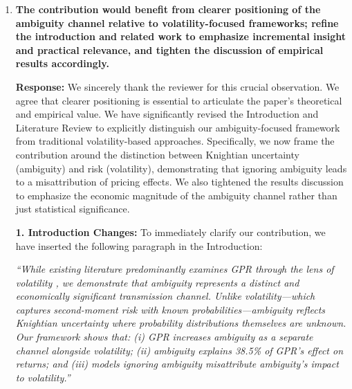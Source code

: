 \documentclass[12pt]{article}
\begin{document}
\begin{enumerate}
\begin{responsebox}
    \vspace{0.5cm}

    \textbf{4. Alternative Explanations:}
    We have tested and ruled out size effects by adding:

    \textit{``Results hold after controlling for firm size and interaction terms. The SOE buffer persists within size quintiles, suggesting it's not merely a scale effect.''}
    \end{responsebox}

    \vspace{0.5cm}

    \item \textbf{The contribution would benefit from clearer positioning of the ambiguity channel relative to volatility-focused frameworks; refine the introduction and related work to emphasize incremental insight and practical relevance, and tighten the discussion of empirical results accordingly.}

    \begin{responsebox}
    \vspace{0.5cm}
    \textbf{Response:} We sincerely thank the reviewer for this crucial observation. We agree that clearer positioning is essential to articulate the paper's theoretical and empirical value. We have significantly revised the Introduction and Literature Review to explicitly distinguish our ambiguity-focused framework from traditional volatility-based approaches. Specifically, we now frame the contribution around the distinction between Knightian uncertainty (ambiguity) and risk (volatility), demonstrating that ignoring ambiguity leads to a misattribution of pricing effects. We also tightened the results discussion to emphasize the economic magnitude of the ambiguity channel rather than just statistical significance.

    \textbf{1. Introduction Changes:}
    To immediately clarify our contribution, we have inserted the following paragraph in the Introduction:

    \begin{highlightbox}
    \textit{``While existing literature predominantly examines GPR through the lens of volatility \citep{Bouri2021, Apergis2021}, we demonstrate that ambiguity represents a distinct and economically significant transmission channel. Unlike volatility---which captures second-moment risk with known probabilities---ambiguity reflects Knightian uncertainty where probability distributions themselves are unknown. Our framework shows that: (i) GPR increases ambiguity as a separate channel alongside volatility; (ii) ambiguity explains 38.5\% of GPR's effect on returns; and (iii) models ignoring ambiguity misattribute ambiguity's impact to volatility.''}
    \end{highlightbox}


\end{responsebox}
\end{enumerate}
\end{document}

